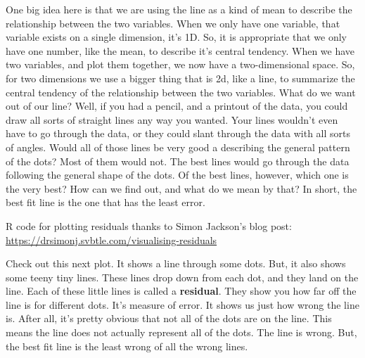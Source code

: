 \documentclass[
]{book}
\begin{document}
One big idea here is that we are using the line as a kind of mean to describe the relationship between the two variables. When we only have one variable, that variable exists on a single dimension, it's 1D. So, it is appropriate that we only have one number, like the mean, to describe it's central tendency. When we have two variables, and plot them together, we now have a two-dimensional space. So, for two dimensions we use a bigger thing that is 2d, like a line, to summarize the central tendency of the relationship between the two variables.
What do we want out of our line? Well, if you had a pencil, and a printout of the data, you could draw all sorts of straight lines any way you wanted. Your lines wouldn't even have to go through the data, or they could slant through the data with all sorts of angles. Would all of those lines be very good a describing the general pattern of the dots? Most of them would not. The best lines would go through the data following the general shape of the dots. Of the best lines, however, which one is the very best? How can we find out, and what do we mean by that? In short, the best fit line is the one that has the least error.

R code for plotting residuals thanks to Simon Jackson's blog post: \url{https://drsimonj.svbtle.com/visualising-residuals}

Check out this next plot. It shows a line through some dots. But, it also shows some teeny tiny lines. These lines drop down from each dot, and they land on the line. Each of these little lines is called a \textbf{residual}. They show you how far off the line is for different dots. It's measure of error. It shows us just how wrong the line is. After all, it's pretty obvious that not all of the dots are on the line. This means the line does not actually represent all of the dots. The line is wrong. But, the best fit line is the least wrong of all the wrong lines.
\end{document}

